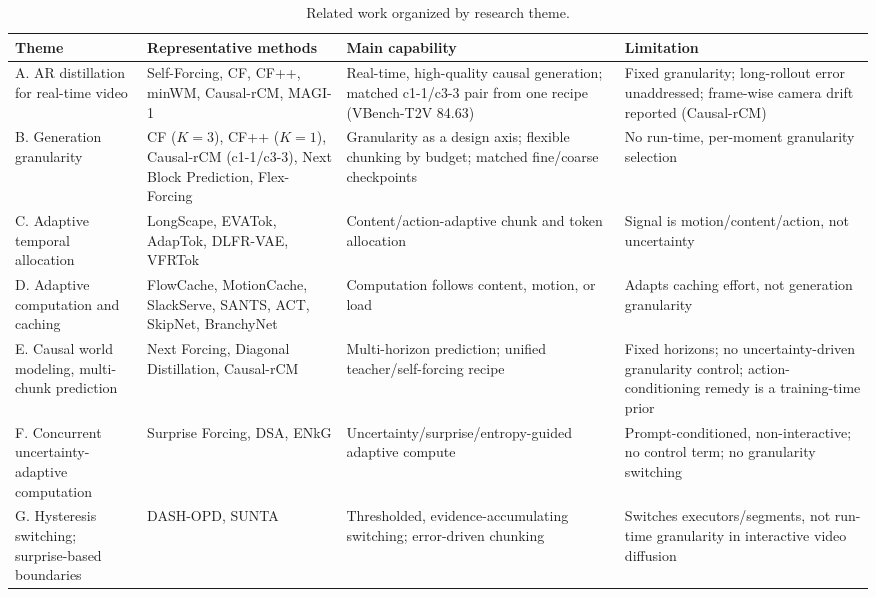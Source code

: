 \documentclass[11pt,a4paper]{article}
\begin{document}
\begin{table}[t]
\centering
\small
\renewcommand{\arraystretch}{1.3}
\begin{tabularx}{\textwidth}{>{\raggedright\arraybackslash}p{2.7cm} >{\raggedright\arraybackslash}p{3.6cm} >{\raggedright\arraybackslash}X >{\raggedright\arraybackslash}X}
\toprule
\textbf{Theme} & \textbf{Representative methods} & \textbf{Main capability} & \textbf{Limitation} \\
\midrule
A. AR distillation for real-time video & Self-Forcing, CF, CF++, minWM, Causal-rCM, MAGI-1 & Real-time, high-quality causal generation; matched c1-1/c3-3 pair from one recipe (VBench-T2V 84.63) & Fixed granularity; long-rollout error unaddressed; frame-wise camera drift reported (Causal-rCM) \\
B. Generation granularity & CF ($K{=}3$), CF++ ($K{=}1$), Causal-rCM (c1-1/c3-3), Next Block Prediction, Flex-Forcing & Granularity as a design axis; flexible chunking by budget; matched fine/coarse checkpoints & No run-time, per-moment granularity selection \\
C. Adaptive temporal allocation & LongScape, EVATok, AdapTok, DLFR-VAE, VFRTok & Content/action-adaptive chunk and token allocation & Signal is motion/content/action, not uncertainty \\
D. Adaptive computation and caching & FlowCache, MotionCache, SlackServe, SANTS, ACT, SkipNet, BranchyNet & Computation follows content, motion, or load & Adapts caching effort, not generation granularity \\
E. Causal world modeling, multi-chunk prediction & Next Forcing, Diagonal Distillation, Causal-rCM & Multi-horizon prediction; unified teacher/self-forcing recipe & Fixed horizons; no uncertainty-driven granularity control; action-conditioning remedy is a training-time prior \\
F. Concurrent uncertainty-adaptive computation & Surprise Forcing, DSA, ENkG & Uncertainty/surprise/entropy-guided adaptive compute & Prompt-conditioned, non-interactive; no control term; no granularity switching \\
G. Hysteresis switching; surprise-based boundaries & DASH-OPD, SUNTA & Thresholded, evidence-accumulating switching; error-driven chunking & Switches executors/segments, not run-time granularity in interactive video diffusion \\
\bottomrule
\end{tabularx}
\caption{Related work organized by research theme.}
\label{tab:themes}
\end{table}
\end{document}
